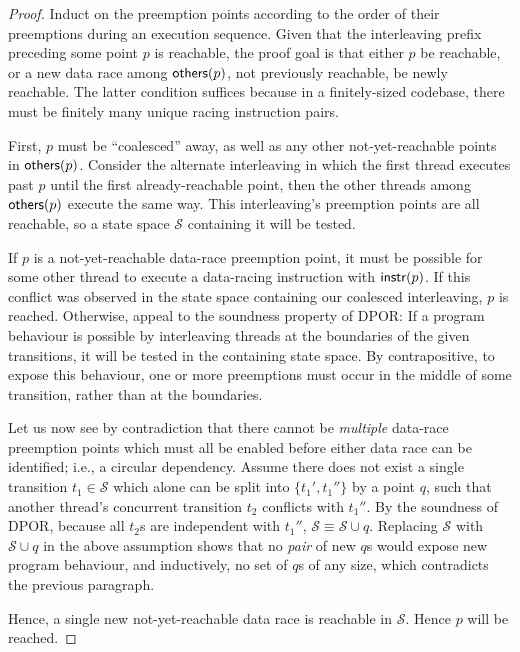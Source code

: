 \begin{proof}
Induct on the preemption points according to the order of their preemptions during an execution sequence.
Given that the interleaving prefix preceding some point $p$ is reachable,
the proof goal is that either $p$ be reachable,
or a new data race among $\mathsf{others}(p)$, not previously reachable, be newly reachable.
The latter condition suffices because in a finitely-sized codebase,
there must be finitely many unique racing instruction pairs.

First, $p$ must be ``coalesced'' away, as well as any other not-yet-reachable points in $\mathsf{others}(p)$.
Consider the alternate interleaving in which the first thread executes past $p$ until the first already-reachable point,
then the other threads among $\mathsf{others}(p)$ execute the same way.
This interleaving's preemption points are all reachable,
so a state space $\mathcal{S}$ containing it will be tested.

If $p$ is a not-yet-reachable data-race preemption point,
it must be possible for some other thread to execute a data-racing instruction with $\mathsf{instr}(p)$.
If this conflict was observed in the state space containing our coalesced interleaving, $p$ is reached.
Otherwise, appeal to the soundness property of DPOR:
If a program behaviour is possible by interleaving threads at the boundaries of the given transitions,
it will be tested in the containing state space.
By contrapositive, to expose this behaviour,
one or more preemptions must occur in the middle of some transition, rather than at the boundaries.

Let us now see by contradiction that there cannot be {\em multiple} data-race preemption points
which must all be enabled before either data race can be identified;
i.e., a circular dependency.
Assume there does not exist a single transition $t_1 \in \mathcal{S}$
which alone can be split into $\{t_1',t_1''\}$ by a point $q$,
such that another thread's concurrent transition $t_2$ conflicts with $t_1''$.
By the soundness of DPOR, because all $t_2$s are independent with $t_1''$, $\mathcal{S} \equiv \mathcal{S} \cup q$.
Replacing $\mathcal{S}$ with $\mathcal{S} \cup q$ in the above assumption shows that no {\em pair} of new $q$s would expose new program behaviour, and inductively, no set of $q$s of any size, which contradicts the previous paragraph.

Hence, a single new not-yet-reachable data race is reachable in $\mathcal{S}$. Hence $p$ will be reached.
\end{proof}

